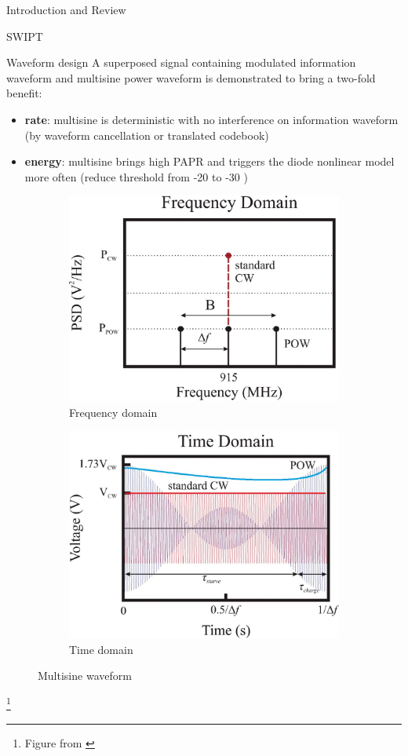 \documentclass[9pt]{beamer}
\newcommand\blfootnote[1]{%
\begingroup
\renewcommand\thefootnote{}\footnote{#1}%
\addtocounter{footnote}{-1}%
\endgroup
}
\begin{document}
\begin{section}{Introduction and Review}
\begin{subsection}{SWIPT}
		\begin{frame}{Waveform design}
			A superposed signal containing \alert{modulated information waveform} and \alert{multisine power waveform} is demonstrated to bring a two-fold benefit:
			\begin{itemize}
				\item \textbf{rate}: multisine is deterministic with no interference on information waveform (by waveform cancellation or translated codebook)
				\item \textbf{energy}: multisine brings high PAPR and triggers the diode nonlinear model more often (reduce threshold from -20 \si{\dBm} to -30 \si{\dBm})
			\end{itemize}
			\begin{figure}
				\centering
				\begin{subfigure}{.48\textwidth}
					\centering
					\includegraphics[width=0.8\linewidth]{assets/multisine_frequency_domain.eps}
					\caption{Frequency domain}
				\end{subfigure}
				\begin{subfigure}{.48\textwidth}
					\centering
					\includegraphics[width=0.8\linewidth]{assets/multisine_time_domain.eps}
					\caption{Time domain}
				\end{subfigure}
				\caption{Multisine waveform}
			\end{figure}
			\blfootnote{Figure from \cite{Trotter2009}}
		\end{frame}
	\end{subsection}


\end{section}
\end{document}
